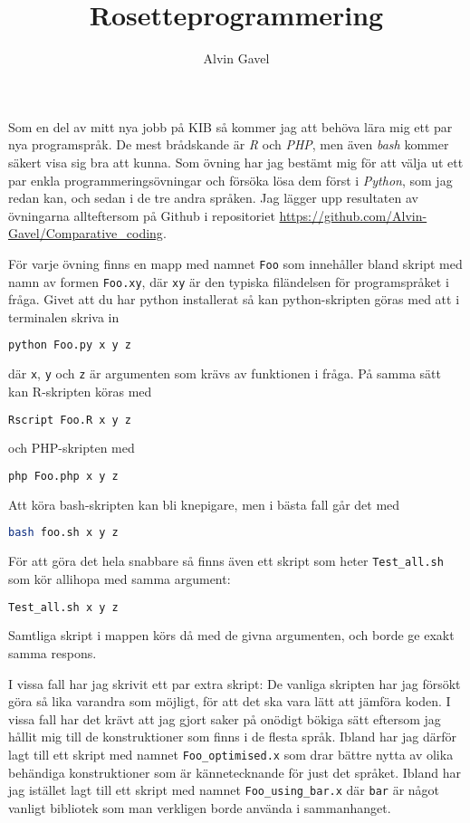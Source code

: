 \documentclass[10pt, twoside,a4paper]{article}
\title{Rosetteprogrammering}
\author{Alvin Gavel}
\date{}                                           %
\begin{document}
\maketitle

\noindent
Som en del av mitt nya jobb på KIB så kommer jag att behöva lära mig ett par nya programspråk. De mest brådskande är \emph{R} och \emph{PHP}, men även \emph{bash} kommer säkert visa sig bra att kunna. Som övning har jag bestämt mig för att välja ut ett par enkla programmeringsövningar och försöka lösa dem först i \emph{Python}, som jag redan kan, och sedan i de tre andra språken. Jag lägger upp resultaten av övningarna allteftersom på Github i repositoriet \url{https://github.com/Alvin-Gavel/Comparative_coding}.

För varje övning finns en mapp med namnet \verb+Foo+ som innehåller bland skript med namn av formen \verb+Foo.xy+, där \verb+xy+ är den typiska filändelsen för programspråket i fråga. Givet att du har python installerat så kan python-skripten göras med att i terminalen skriva in
\begin{lstlisting}[language=bash]
python Foo.py x y z
\end{lstlisting}
där \verb+x+, \verb+y+ och \verb+z+ är argumenten som krävs av funktionen i fråga. På samma sätt kan R-skripten köras med
\begin{lstlisting}[language=bash]
Rscript Foo.R x y z
\end{lstlisting}
och PHP-skripten med 
\begin{lstlisting}[language=bash]
php Foo.php x y z
\end{lstlisting}
Att köra bash-skripten kan bli knepigare, men i bästa fall går det med
\begin{lstlisting}[language=bash]
bash foo.sh x y z
\end{lstlisting}
För att göra det hela snabbare så finns även ett skript som heter \verb+Test_all.sh+ som kör allihopa med samma argument:
\begin{lstlisting}[language=bash]
Test_all.sh x y z
\end{lstlisting}
Samtliga skript i mappen körs då med de givna argumenten, och borde ge exakt samma respons.

I vissa fall har jag skrivit ett par extra skript: De vanliga skripten har jag försökt göra så lika varandra som möjligt, för att det ska vara lätt att jämföra koden. I vissa fall har det krävt att jag gjort saker på onödigt bökiga sätt eftersom jag hållit mig till de konstruktioner som finns i de flesta språk. Ibland har jag därför lagt till ett skript med namnet \verb+Foo_optimised.x+ som drar bättre nytta av olika behändiga konstruktioner som är kännetecknande för just det språket. Ibland har jag istället lagt till ett skript med namnet \verb+Foo_using_bar.x+ där \verb+bar+ är något vanligt bibliotek som man verkligen borde använda i sammanhanget.
\end{document}
